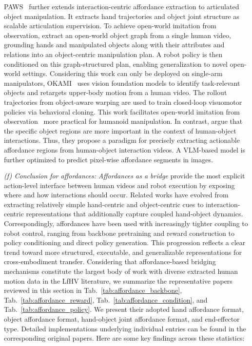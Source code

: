 \documentclass[Afour,sageh,times]{sagej}
\begin{document}
PAWS~\citep{wang2026paws} further extends interaction-centric affordance extraction to articulated object manipulation. It extracts hand trajectories and object joint structure as scalable articulation supervision. To achieve open-world imitation from observation, \cite{zhu2024vision} extract an open-world object graph from a single human video, grounding hands and manipulated objects along with their attributes and relations into an object-centric manipulation plan. A robot policy is then conditioned on this graph-structured plan, enabling generalization to novel open-world settings. Considering this work can only be deployed on single-arm manipulators, OKAMI~\citep{li2024okami} uses vision foundation models to identify task-relevant objects and retargets upper-body motion from a human video. The rollout trajectories from object-aware warping are used to train closed-loop visuomotor policies via behavioral cloning. This work facilitates open-world imitation from observation~\citep{zhu2024vision} more practical for humanoid manipulation. In contrast, \cite{heidinger20252handedafforder} argue that the specific object regions are more important in the context of human-object interactions. Thus, they propose a paradigm for precisely extracting actionable affordance regions from human-object interaction videos. A VLM-based model is further optimized to predict pixel-wise affordance segments in images.




\textit{(f) Conclusion for affordances:} \textit{Affordances as a bridge} provide the most explicit action-level interface between human videos and robot execution by exposing where and how interactions should occur. Related works have evolved from extracting relatively simple hand-centric and object-centric cues to interaction-centric representations that additionally capture coupled hand-object dynamics. Correspondingly, affordances have been used with increasingly tighter coupling to robot control, ranging from backbone pretraining and reward construction to policy conditioning and direct policy generation. This progression reflects a clear trend toward more structured, executable, and generalizable representations for cross-embodiment transfer. Considering that affordance-based bridging mechanisms constitute the largest body of work with diverse extracted human motion data in the LfHV literature, we summarize the representative papers reviewed in this section in Tab.~\ref{tab:affordance_backbone}, Tab.~\ref{tab:affordance_reward}, Tab.~\ref{tab:affordance_condition}, and Tab.~\ref{tab:affordance_policy}. We present their adopted hand affordance format, object affordance format, hand-object joint affordance format, and end-effector type. Detailed implementations underlying individual entries can be found in the corresponding original papers. Here are some key findings across these statistics:
\end{document}
